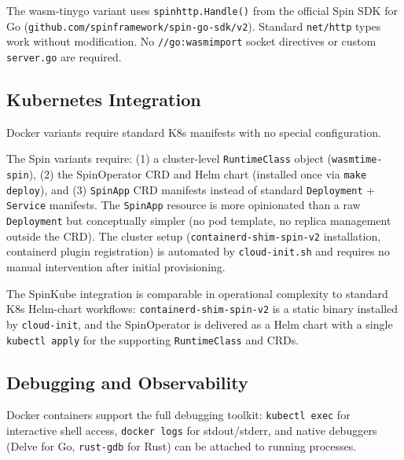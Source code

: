 \begin{sloppypar}
The wasm-tinygo variant uses \texttt{spinhttp.Handle()} from the official Spin \acs{SDK} for Go (\texttt{github.com/spinframework/spin-go-sdk/v2}). Standard \texttt{net/http} types work without modification. No \texttt{//go:wasmimport} socket directives or custom \texttt{server.go} are required.
\end{sloppypar}

\subsection{Kubernetes Integration}

Docker variants require standard \acs{K8s} manifests with no special configuration.

\begin{sloppypar}
The Spin variants require: (1) a cluster-level \texttt{RuntimeClass} object (\texttt{wasmtime-spin}), (2) the SpinOperator \acs{CRD} and Helm chart (installed once via \texttt{make deploy}), and (3) \texttt{SpinApp} \acs{CRD} manifests instead of standard \texttt{Deployment} + \texttt{Service} manifests. The \texttt{SpinApp} resource is more opinionated than a raw \texttt{Deployment} but conceptually simpler (no pod template, no replica management outside the \acs{CRD}). The cluster setup (\texttt{containerd-shim-spin-v2} installation, containerd plugin registration) is automated by \texttt{cloud-init.sh} and requires no manual intervention after initial provisioning.
\end{sloppypar}

\begin{sloppypar}
The SpinKube integration is comparable in operational complexity to standard \acs{K8s} Helm-chart workflows: \texttt{containerd-shim-spin-v2} is a static binary installed by \texttt{cloud-init}, and the SpinOperator is delivered as a Helm chart with a single \texttt{kubectl apply} for the supporting \texttt{RuntimeClass} and \acs{CRD}s.
\end{sloppypar}

\subsection{Debugging and Observability}

\begin{sloppypar}
Docker containers support the full debugging toolkit: \texttt{kubectl exec} for interactive shell access, \texttt{docker logs} for stdout/stderr, and native debuggers (Delve for Go, \texttt{rust-gdb} for Rust) can be attached to running processes.
\end{sloppypar}

